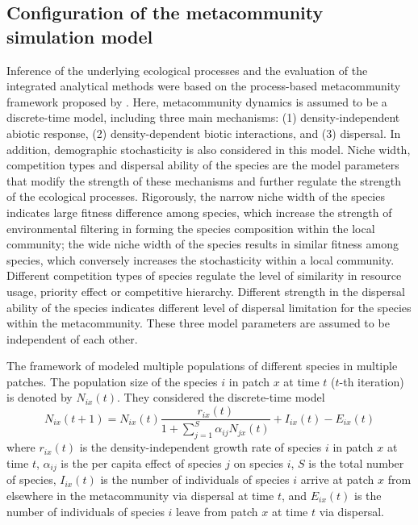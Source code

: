 \subsection{Configuration of the metacommunity simulation model}
\noindent
Inference of the underlying ecological processes and the evaluation of the integrated analytical methods were based on the process-based metacommunity framework proposed by \citet{thompson2020process}. Here, metacommunity dynamics is assumed to be a discrete-time model, including three main mechanisms: (1) density-independent abiotic response, (2) density-dependent biotic interactions, and (3) dispersal. In addition, demographic stochasticity is also considered in this model. Niche width, competition types and dispersal ability of the species are the model parameters that modify the strength of these mechanisms and further regulate the strength of the ecological processes. Rigorously, the narrow niche width of the species indicates large fitness difference among species, which increase the strength of environmental filtering in forming the species composition within the local community; the wide niche width of the species results in similar fitness among species, which conversely increases the stochasticity within a local community. Different competition types of species regulate the level of similarity in resource usage, priority effect or competitive hierarchy. Different strength in the dispersal ability of the species indicates different level of dispersal limitation for the species within the metacommunity. These three model parameters are assumed to be independent of each other. 

The framework of \citet{thompson2020process} modeled multiple populations of different species in multiple patches. The population size of the species $i$ in patch $x$ at time $t$ ($t$-th iteration) is denoted by $N_{ix}(t)$. They considered the discrete-time model
\[
N_{ix}(t+1) = N_{ix}(t)\dfrac{r_{ix}(t)}{1+\sum_{j = 1}^S\alpha_{ij}N_{jx}(t)} + I_{ix}(t) - E_{ix}(t)
\]
where 
$r_{ix}(t)$ is the density-independent growth rate of species $i$ in patch $x$ at time $t$, $\alpha_{ij}$ is the per capita effect of species $j$ on species $i$, $S$ is the total number of species, $I_{ix}(t)$ is the number of individuals of species $i$ arrive at patch $x$ from elsewhere in the metacommunity via dispersal at time $t$, and $E_{ix}(t)$ is the number of individuals of species $i$ leave from patch $x$ at time $t$ via dispersal.



